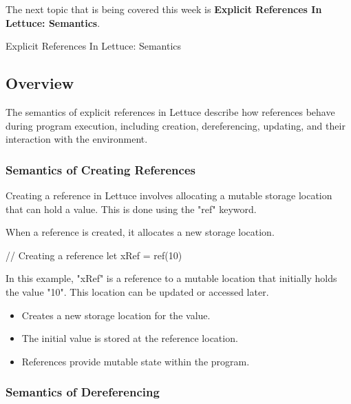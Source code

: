 The next topic that is being covered this week is \textbf{Explicit References In Lettuce: Semantics}.

\begin{notes}{Explicit References In Lettuce: Semantics}
    \subsection*{Overview}

    The semantics of explicit references in Lettuce describe how references behave during program execution, including creation, dereferencing, updating, and their interaction with the environment.
    
    \subsubsection*{Semantics of Creating References}
    
    Creating a reference in Lettuce involves allocating a mutable storage location that can hold a value. This is done using the "ref" keyword.
    
    \begin{highlight}
    
        When a reference is created, it allocates a new storage location.
    
    \begin{code}[Lettuce]
    // Creating a reference
    let xRef = ref(10)
    \end{code}
    
        In this example, "xRef" is a reference to a mutable location that initially holds the value "10". This location can be updated or accessed later.
    
        \begin{itemize}
            \item Creates a new storage location for the value.
            \item The initial value is stored at the reference location.
            \item References provide mutable state within the program.
        \end{itemize}
    
    \end{highlight}
    
    \subsubsection*{Semantics of Dereferencing}
    

\end{notes}
